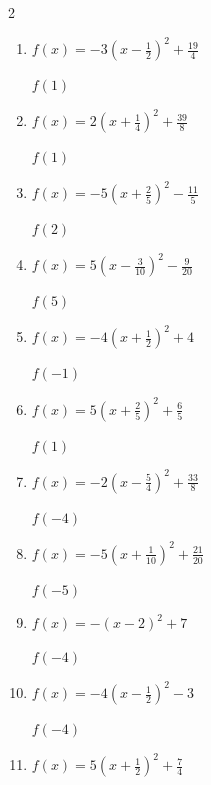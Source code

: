 \begin{multicols}{2}
\begin{enumerate}
$f(-5)$
        \phantom{$=63$}

  \item $\displaystyle f(x)=-3\left( x-\frac{1}{2}\right)^{2}+\frac{19}{4}$

$f(1)$
        \phantom{$=4$}

  \item $\displaystyle f(x)=2\left( x+\frac{1}{4}\right)^{2}+\frac{39}{8}$

$f(1)$
        \phantom{$=8$}

  \item $\displaystyle f(x)=-5\left( x+\frac{2}{5}\right)^{2}-\frac{11}{5}$

$f(2)$
        \phantom{$=-31$}

\columnbreak %

\resetques

  \item $\displaystyle f(x)=5\left( x-\frac{3}{10}\right)^{2}-\frac{9}{20}$

$f(5)$
        \phantom{$=110$}

  \item $\displaystyle f(x)=-4\left( x+\frac{1}{2}\right)^{2}+4$

$f(-1)$
        \phantom{$=3$}

  \item $\displaystyle f(x)=5\left( x+\frac{2}{5}\right)^{2}+\frac{6}{5}$

$f(1)$
        \phantom{$=11$}

  \item $\displaystyle f(x)=-2\left( x-\frac{5}{4}\right)^{2}+\frac{33}{8}$

$f(-4)$
        \phantom{$=-51$}

  \item $\displaystyle f(x)=-5\left( x+\frac{1}{10}\right)^{2}+\frac{21}{20}$

$f(-5)$
        \phantom{$=-119$}

\columnbreak %

  \item $\displaystyle f(x)=-\left( x-2\right)^{2}+7$

$f(-4)$
        \phantom{$=-29$}

  \item $\displaystyle f(x)=-4\left( x-\frac{1}{2}\right)^{2}-3$

$f(-4)$
        \phantom{$=-84$}

  \item $\displaystyle f(x)=5\left( x+\frac{1}{2}\right)^{2}+\frac{7}{4}$


\end{enumerate}
\end{multicols}
